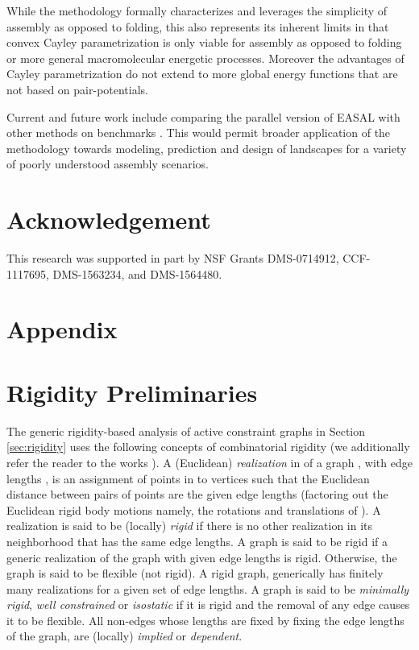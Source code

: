 \documentclass[]{article}
\begin{document}
While the methodology formally characterizes and leverages the simplicity of
assembly as opposed to folding, this also represents its inherent limits in
that convex Cayley parametrization is only viable for assembly as opposed to
folding or more general macromolecular energetic processes. Moreover the
advantages of Cayley parametrization do not extend to more global energy
functions that are not based on pair-potentials.

Current and future work include comparing the parallel version of EASAL with
other methods \cite{Griffiths2019} on benchmarks
\cite{Chill2014,cha2015accelerated}. This would permit broader application of
the methodology towards modeling, prediction and design of landscapes for a
variety of poorly understood assembly scenarios.
 
\section*{Acknowledgement}
This research was supported in part by NSF Grants
DMS-0714912, CCF-1117695, DMS-1563234, and DMS-1564480.





\section*{Appendix}
\appendix
\section{Rigidity Preliminaries}
\label{sec:app:rigidity}
The generic rigidity-based analysis of active constraint graphs in Section
\ref{sec:rigidity} uses the following concepts of combinatorial
rigidity (we additionally refer the reader to the works
\cite{SJS:Handbook,CombinatorialRigidity}).  A (Euclidean)
\emph{realization} in  of a graph , with edge
lengths , is an assignment of points
in  to vertices such that the Euclidean distance between
pairs of points are the given edge lengths  (factoring out the
 Euclidean rigid body motions namely, the rotations and
translations of ). A realization is said to be (locally)
\emph{rigid} if there is no other realization in its neighborhood that
has the same edge lengths. A graph is said to be rigid if a generic
realization of the graph with given edge lengths is rigid. Otherwise,
the graph is said to be flexible (not rigid).  A rigid graph,
generically has finitely many realizations for a given set of edge
lengths. A graph is said to be \emph{minimally rigid}, \emph{well
constrained} or \emph{isostatic} if it is rigid and the removal of any
edge causes it to be flexible.  All non-edges whose lengths are fixed by
fixing the edge lengths of the graph, are 
(locally) \emph{implied} or
\emph{dependent}. 
\end{document}
